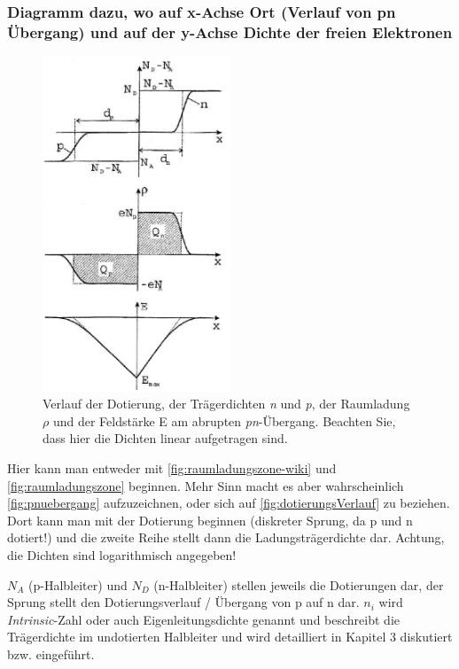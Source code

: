 \documentclass{article}
\begin{document}
	\subsubsection{Diagramm dazu, wo auf x-Achse Ort (Verlauf von pn Übergang) und auf der y-Achse Dichte der freien Elektronen}
       \begin{figure}[H]
        \centering
        \includegraphics[width=0.5\textwidth]{fig/dotierungsVerlauf}
        \caption{Verlauf der Dotierung, der Trägerdichten \textit{n} und \textit{p}, der Raumladung $\rho$ und der Feldstärke E am abrupten \textit{pn}-Übergang. Beachten Sie, dass hier die Dichten linear aufgetragen sind.}
        \label{fig:dotierungsVerlauf}
    \end{figure}

	Hier kann man entweder mit \autoref{fig:raumladungszone-wiki} und \autoref{fig:raumladungszone} beginnen.
	Mehr Sinn macht es aber wahrscheinlich \autoref{fig:pnuebergang} aufzuzeichnen, oder sich auf \autoref{fig:dotierungsVerlauf} zu beziehen. 
	Dort kann man mit der Dotierung beginnen (diskreter Sprung, da p und n dotiert!) und die zweite Reihe stellt dann die Ladungsträgerdichte dar. Achtung, die Dichten sind logarithmisch angegeben!
	
	$N_A$ (p-Halbleiter) und $N_D$ (n-Halbleiter) stellen jeweils die Dotierungen dar, der Sprung stellt den Dotierungsverlauf / Übergang von p auf n dar.
	$n_i$ wird \textit{Intrinsic}-Zahl oder auch Eigenleitungsdichte genannt und beschreibt die Trägerdichte im undotierten Halbleiter und wird detailliert in Kapitel 3 diskutiert bzw. eingeführt. 
	
\end{document}
